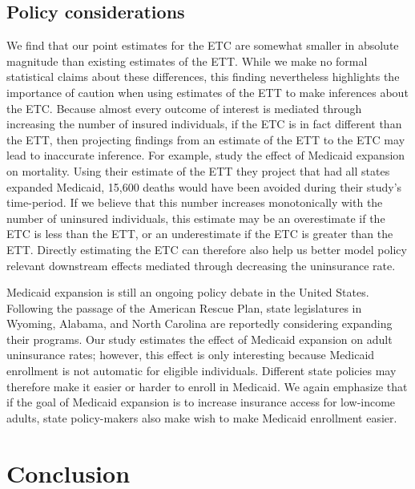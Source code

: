 \subsection{Policy considerations}

We find that our point estimates for the ETC are  somewhat smaller in absolute magnitude than existing estimates of the ETT. While we make no formal statistical claims about these differences, this finding nevertheless highlights the importance of caution when using estimates of the ETT to make inferences about the ETC. Because almost every outcome of interest is mediated through increasing the number of insured individuals, if the ETC is in fact different than the ETT, then projecting findings from an estimate of the ETT to the ETC may lead to inaccurate inference. For example, \cite{miller2019medicaid} study the effect of Medicaid expansion on mortality. Using their estimate of the ETT they project that had all states expanded Medicaid, 15,600 deaths would have been avoided during their study's time-period. If we believe that this number increases monotonically with the number of uninsured individuals, this estimate may be an overestimate if the ETC is less than the ETT, or an underestimate if the ETC is greater than the ETT. Directly estimating the ETC can therefore also help us better model policy relevant downstream effects mediated through decreasing the uninsurance rate. 

Medicaid expansion is still an ongoing policy debate in the United States. Following the passage of the American Rescue Plan, state legislatures in Wyoming, Alabama, and North Carolina are reportedly considering expanding their programs. Our study estimates the effect of Medicaid expansion on adult uninsurance rates; however, this effect is only interesting because Medicaid enrollment is not automatic for eligible individuals. Different state policies may therefore make it easier or harder to enroll in Medicaid. We again emphasize that if the goal of Medicaid expansion is to increase insurance access for low-income adults, state policy-makers also make wish to make Medicaid enrollment easier. 

\section{Conclusion}

